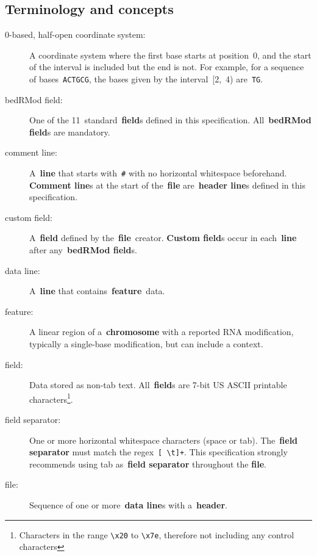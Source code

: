 \documentclass[11pt]{article}
\begin{document}
\subsection{Terminology and concepts}\label{sec:terms}
\begin{description}
\item[0-based, half-open coordinate system:]
  A coordinate system where the first base starts at position~0, and the start of the interval is included but the end is not.
  For example, for a sequence of bases~\texttt{ACTGCG}, the bases given by the interval~[2,~4) are~\texttt{TG}. %

\item[\acs{bedRMod} field:]
  One of the 11~standard~\textbf{field}s defined in this specification.
  All~\textbf{\acs{bedRMod} field}s are mandatory.

\item[comment line:]
  A~\textbf{line} that starts with~\texttt{\#} with no horizontal whitespace beforehand. \textbf{Comment line}s at the start of 
  the~\textbf{file} are~\textbf{header line}s defined in this specification.

\item[custom field:]
  A~\textbf{field} defined by the~\textbf{file}~creator.
  \textbf{Custom field}s occur in each~\textbf{line} after any~\textbf{\acs{bedRMod} field}s.

\item[data line:]
  A~\textbf{line} that contains~\textbf{feature}~data.

\item[feature:]
  A linear region of a~\textbf{chromosome} with a reported RNA modification, typically a single-base modification, but can include a context.

\item[field:]
  Data stored as non-tab text.
  All~\textbf{field}s are 7-bit US \ac{ASCII} printable characters\footnote{Characters in the range \texttt{{\textbackslash}x20} to \texttt{{\textbackslash}x7e}, therefore not including any control characters}.

\item[field separator:]
  One or more horizontal whitespace characters (space or tab).
  The~\textbf{field separator} must match the \ac{regex}~\texttt{[ {\textbackslash}t]+}.
  This specification strongly recommends using tab as~\textbf{field separator} throughout the \textbf{file}.

\item[file:]
  Sequence of one or more~\textbf{data line}s with a~\textbf{header}.


\end{description}
\end{document}
